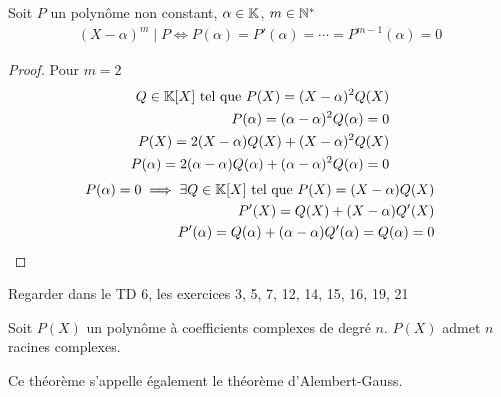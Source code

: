 \begin{graybox}
\begin{theoreme}
Soit $P$ un polynôme non constant, $\alpha \in \mathbb{K}$, $m \in \mathbb{N}^*$
\begin{align*}
(X - \alpha)^m \mid P \iff P(\alpha) = P'(\alpha) = \cdots = P^{m-1}(\alpha) = 0
\end{align*}
\end{theoreme}
\end{graybox}

\begin{proof} Pour $m = 2$ \\
\fbox{$\implies$}
\begin{align*}
Q \in \mathbb{K} [X] \text{ tel que } P(X) = (X - \alpha)^2 Q(X) \\
P(\alpha) = (\alpha - \alpha)^2 Q(\alpha) = 0 \\
P(X) = 2(X - \alpha) Q(X) + (X - \alpha)^2 Q(X) \\
P(\alpha) = 2 (\alpha - \alpha) Q(\alpha) + (\alpha - \alpha)^2 Q(\alpha) = 0
\end{align*}
\fbox{$\impliedby$}
\begin{align*}
P(\alpha) = 0 \implies \exists Q \in \mathbb{K}[X] \text{ tel que } P(X) = (X - \alpha) Q(X) \\
P'(X) = Q(X) + (X - \alpha)Q'(X) \\
P'(\alpha) = Q(\alpha) + (\alpha - \alpha) Q'(\alpha) = Q(\alpha) = 0
\end{align*}
\end{proof}

\begin{remarque}
Regarder dans le TD 6, les exercices 3, 5, 7, 12, 14, 15, 16, 19, 21
\end{remarque}

\begin{graybox}
\begin{theoreme}
Soit $P(X)$ un polynôme à coefficients complexes de degré $n$. $P(X)$ admet $n$ racines complexes. 
\end{theoreme}
\end{graybox}

\begin{remarque}
Ce théorème s'appelle également le théorème d'Alembert-Gauss.
\end{remarque}
